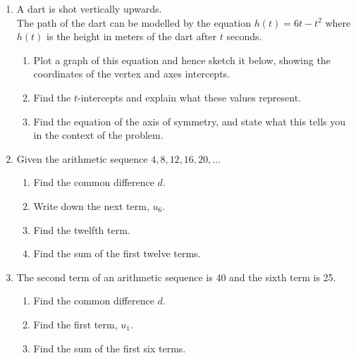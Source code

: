 \documentclass[12pt, twoside]{article}
\begin{document}
\begin{enumerate}
\newpage
\item A dart is shot vertically upwards.\\[0.25cm]
The path of the dart can be modelled by the equation $h(t)=6t-t^2$ where $h(t)$ is the height in meters of the dart after $t$ seconds.
    \begin{enumerate}
        \item Plot a graph of this equation and hence sketch it below, showing the coordinates of the vertex and axes intercepts.
        \item Find the $t$-intercepts and explain what these values represent. \vspace{2cm}
        \item Find the equation of the axis of symmetry, and state what this tells you in the context of the problem. \vspace{2cm}
    \end{enumerate}
    \begin{center}
    \end{center}

\newpage
\item Given the arithmetic sequence $4,8,12,16,20, \dots$
    \begin{enumerate}[itemsep=0.8cm]
    \item Find the common difference $d$.
    \item Write down the next term, $u_6$.
    \item Find the twelfth term.\vspace{1cm}
    \item Find the sum of the first twelve terms.
    \end{enumerate} \vspace{2cm}

\item The second term of an arithmetic sequence is 40 and the sixth term is 25.
    \begin{enumerate}[itemsep=2.5cm]
    \item Find the common difference $d$.
    \item Find the first term, $u_{1}$.
    \item Find the sum of the first six terms.
    \end{enumerate} \vspace{2cm}


\end{enumerate}
\end{document}
